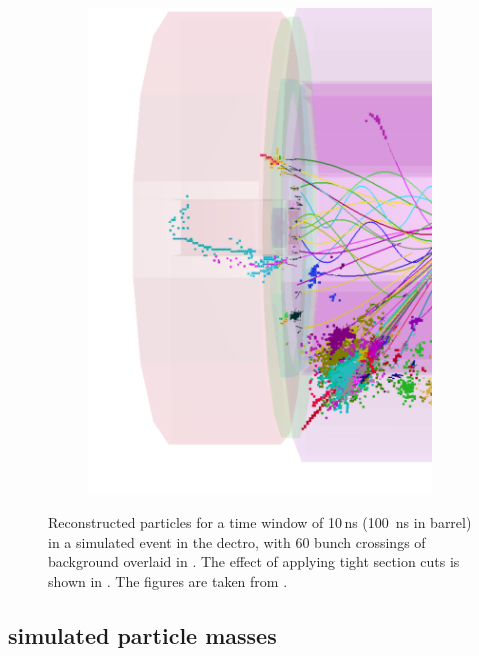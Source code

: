 \begin{figure}[tbph]
\begin{subfigure}[b]{0.45\textwidth}
    \includegraphics[width=\textwidth]{pandora/evtDisplayggHad2}
    \caption{}
    \label{fig:pandoraEvtDisplayggHad2}
  \end{subfigure}
\caption[Effect of the suppression of the background with the tight \PFO selection.]
{Reconstructed particles for a time window of 10\,ns (100 \,ns in \HCAL barrel) in a simulated \HepProcess{\Pep\Pem \to \PHiggs\PHiggs \to \Ptop\APbottom\Pbottom\APtop} event in the \CLICILD dectro, with 60 bunch crossings of \ggHad background overlaid in . The effect of applying tight \PFO section cuts is shown in .  The figures are taken from \cite{Marshall:2012ry}.}
\label{fig:pandoraEvtDisplayggHad}
\end{figure}

\subsection{\CLIC simulated particle masses}
\label{sec:pandoraCLICsimMass}

